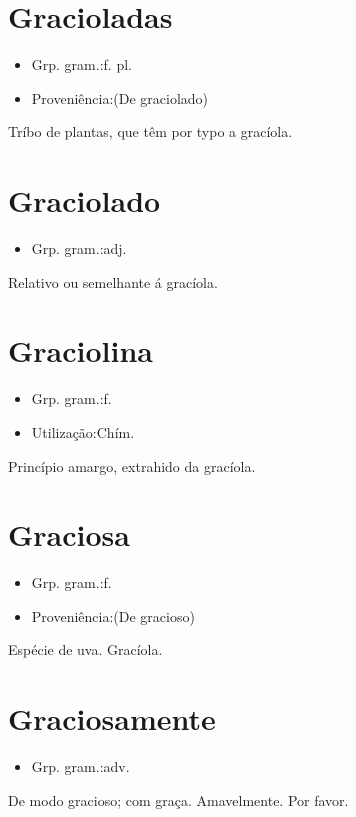 \section{Gracioladas}
\begin{itemize}
\item {Grp. gram.:f. pl.}
\end{itemize}
\begin{itemize}
\item {Proveniência:(De \textunderscore graciolado\textunderscore )}
\end{itemize}
Tríbo de plantas, que têm por typo a gracíola.
\section{Graciolado}
\begin{itemize}
\item {Grp. gram.:adj.}
\end{itemize}
Relativo ou semelhante á \textunderscore gracíola\textunderscore .
\section{Graciolina}
\begin{itemize}
\item {Grp. gram.:f.}
\end{itemize}
\begin{itemize}
\item {Utilização:Chím.}
\end{itemize}
Princípio amargo, extrahido da gracíola.
\section{Graciosa}
\begin{itemize}
\item {Grp. gram.:f.}
\end{itemize}
\begin{itemize}
\item {Proveniência:(De \textunderscore gracioso\textunderscore )}
\end{itemize}
Espécie de uva.
Gracíola.
\section{Graciosamente}
\begin{itemize}
\item {Grp. gram.:adv.}
\end{itemize}
De modo gracioso; com graça.
Amavelmente.
Por favor.
